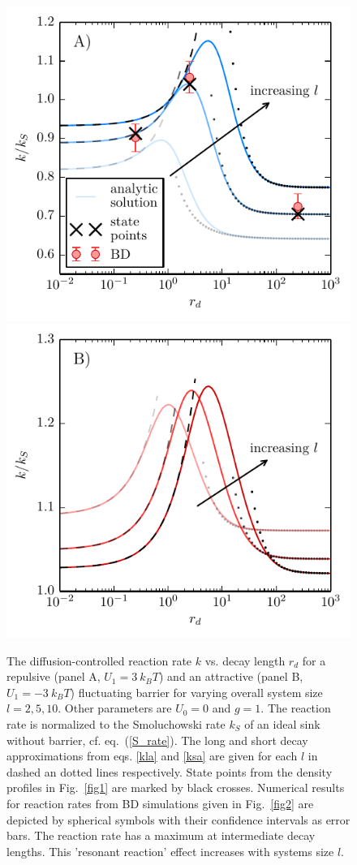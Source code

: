 \documentclass[preprint,superscriptaddress]{revtex4-1}
\begin{document}
\begin{figure}[H]
\begin{center}
\includegraphics[width= .35 \textwidth]{plots/l2_rb_rates.pdf}
\includegraphics[width= .35 \textwidth]{plots/l2_ab_rates.pdf}
\caption{The diffusion-controlled reaction rate $k$ vs. decay length $r_d$ for a repulsive (panel A, $U_1 = 3 ~k_BT$) and an attractive (panel B, $U_1 = -3 ~k_BT$) fluctuating barrier for varying overall system size $l = 2, 5, 10$. Other parameters are $U_0= 0$ and $g = 1$. The reaction rate is normalized to the Smoluchowski rate $k_{S}$ of an ideal sink without barrier, cf. eq.~(\ref{S_rate}). The long and short decay approximations from eqs. \eqref{kla} and \eqref{ksa} are given for each $l$ in dashed an dotted lines respectively. State points from the density profiles in Fig.~\ref{fig1} are marked by black crosses. Numerical results for reaction rates from BD simulations given in Fig.~\ref{fig2} are depicted by spherical symbols with their confidence intervals as error bars. The reaction rate has a maximum at intermediate decay lengths. This 'resonant reaction' effect increases with systems size $l$.}\label{fig3}
\end{center}
\end{figure}
\end{document}
